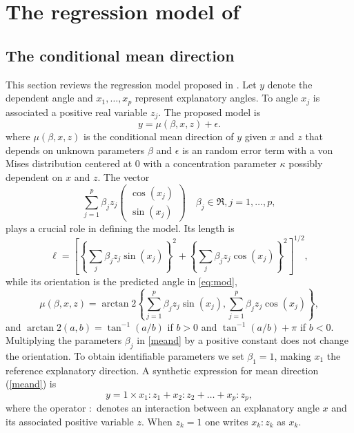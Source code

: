 \section{The regression model of \citet{Rivest16}}

\subsection{The conditional mean direction}


This section reviews the regression model proposed in \citet{Rivest16}. Let $y$ denote the dependent angle and $x_1,\ldots, x_p$ represent explanatory angles.  To angle $x_j$ is associated a positive real variable $z_j$.  The proposed model is
\begin{equation}\label{eq:mod}
    y = \mu(\beta,x,z) + \epsilon.
\end{equation}
where $\mu(\beta,x,z)$ is the conditional mean direction of $y$ given $x$ and $z$ that depends on unknown parameters $\beta$  and $\epsilon$ is an random error term with a von Mises distribution centered at 0 with a concentration parameter $\kappa$ possibly dependent on $x$ and $z$. The vector
\begin{equation}
\label{vect}
\sum_{j=1}^p \beta_jz_j\left( \begin{array}{c} \cos(x_j) \\ \sin (x_j)
\end{array}\right) \quad \beta_j \in \Re, j=1,\ldots,p,
\end{equation}
plays a crucial role in defining the model. Its length is
\begin{equation}
\label{leng} \ell=\left[\left\{\sum_{j} \beta_j z_j\sin(x_j)\right\}^2+\left\{\sum_{j}  \beta_j z_j
\cos(x_j)\right\}^2\right]^{1/2},
\end{equation}
while its orientation is the predicted angle in \eqref{eq:mod},
\begin{equation}
\label{meand}
\mu(\beta,x,z)=
\arctan2\left\{\sum_{j=1}^p \beta_j z_j \sin(x_j),\sum_{j=1}^p
\beta_j z_j \cos(x_j)\right\},
\end{equation}
and $\arctan2(a,b)=\tan^{-1}(a/b)$ if $b>0$ and $\tan^{-1}(a/b)+ \pi$ if $b<0$.  Multiplying the parameters $\beta_j$ in \eqref{meand} by a positive constant does not change the orientation. To obtain identifiable parameters we set $\beta_1=1$, making $x_1$ the reference explanatory direction.  A  synthetic expression for mean direction (\ref{meand}) is
\begin{equation}\label{eq:mods}
y = 1 \times x_1:z_1 + x_2:z_2 + \ldots + x_p:z_p,
\end{equation}
where the operator $:$ denotes an interaction between an explanatory angle $x$ and its associated positive variable $z$. When $z_k=1$ one writes $x_k:z_k$ as $x_k$.

